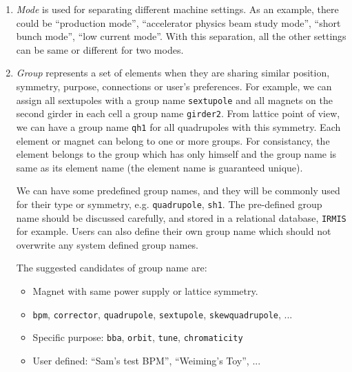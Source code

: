 \documentclass[letterpaper,showtrims]{memoir}
\newcommand{\code}[1]{\texttt{#1}}
\begin{document}
\begin{enumerate}
\item \emph{Mode}
is used for separating different machine settings. As an example, there
could be ``production mode'', ``accelerator physics beam study mode'',
``short bunch mode'', ``low current mode''. With this separation, all
the other settings can be same or different for two modes.

\item \emph{Group} represents a set of elements when they are
  sharing similar position, symmetry, purpose, connections or user's
  preferences. For example, we can assign all sextupoles with a group name
  \code{sextupole} and all magnets on the second girder in each cell a
  group name \code{girder2}. From lattice point of view, we can have a
  group name \code{qh1} for all quadrupoles with this symmetry. Each
  element or magnet can belong to one or more groups.  For consistancy,
  the element belongs to the group which has only himself and the group
  name is same as its element name (the element name is guaranteed
  unique).

  We can have some predefined group names, and they will be commonly used
  for their type or symmetry, e.g. \code{quadrupole}, \code{sh1}. The
  pre-defined group name should be discussed carefully, and stored in a
  relational database, \code{IRMIS} for example. Users can also define
  their own group name which should not overwrite any system defined group
  names.

  The suggested candidates of group name are:
  \begin{itemize}
  \item Magnet with same power supply or lattice symmetry.
  \item \code{bpm}, \code{corrector}, \code{quadrupole}, \code{sextupole},
    \code{skewquadrupole}, ...
  \item Specific purpose: \code{bba}, \code{orbit}, \code{tune},
    \code{chromaticity}
  \item User defined: ``Sam's test BPM'', ``Weiming's Toy'', ...
  \end{itemize}


\end{enumerate}
\end{document}
